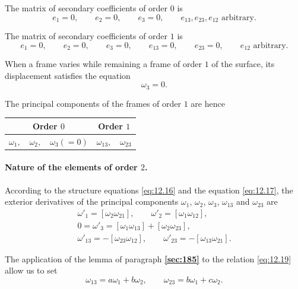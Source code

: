 \documentclass[leqno,11pt]{book}
\numberwithin{equation}{chapter}
\theoremstyle{shape1}
\theoremstyle{shapesmall}
\newcommand{\fsref}[1]{{\rm\textsection\textbf{\ref{sec:#1}}}}
\begin{document}
The matrix of secondary coefficients of order $0$ is
\[
e_{1}=0,\qquad e_{2}=0,\qquad e_{3}=0,\qquad e_{13},e_{23},e_{12}\text{ arbitrary.}
\]

The matrix of secondary coefficients of order $1$ is
\[
e_{1}=0,\qquad e_{2}=0,\qquad e_{3}=0,\qquad e_{13}=0,\qquad e_{23}=0,\qquad e_{12}\text{ arbitrary.}
\]

When a frame varies while remaining a frame of order $1$ of the surface, its displacement satisfies the equation
\begin{equation}
  \label{eq:12.17}
  \omega_{3}=0.
\end{equation}

The principal components of the frames of order $1$ are hence
\begin{center}  
\begin{tabular}{|c|c|}
  \hline
  Order $0$&Order $1$\\
  \hline
  $\omega_{1},\quad\omega_{2},\quad\omega_{3}(=0)$&$\omega_{13},\quad\omega_{23}$\\
  \hline
\end{tabular}
\end{center}


\paragraph{Nature of the elements of order $2$.}
\label{sec:187}
According to the structure equations \eqref{eq:12.16} and the equation \eqref{eq:12.17}, the exterior derivatives of the principal components $\omega_{1}$, $\omega_{2}$, $\omega_{3}$, $\omega_{13}$ and $\omega_{23}$ are
\begin{gather}
  \label{eq:12.18}
  \omega'_{1}=[\omega_{2}\omega_{21}],\qquad\omega'_{2}=[\omega_{1}\omega_{12}],\\
  \label{eq:12.19}
  0=\omega'_{3}=[\omega_{1}\omega_{13}]+[\omega_{2}\omega_{23}],\\
  \label{eq:12.20}
  \omega'_{13}=-[\omega_{23}\omega_{12}],\qquad\omega'_{23}=-[\omega_{13}\omega_{21}].
\end{gather}

The application of the lemma of paragraph \fsref{185} to the relation \eqref{eq:12.19} allow us to set
\begin{equation}
  \label{eq:12.21}
  \omega_{13}=a\omega_{1}+b\omega_{2},\qquad\omega_{23}=b\omega_{1}+c\omega_{2}.
\end{equation}
\end{document}
